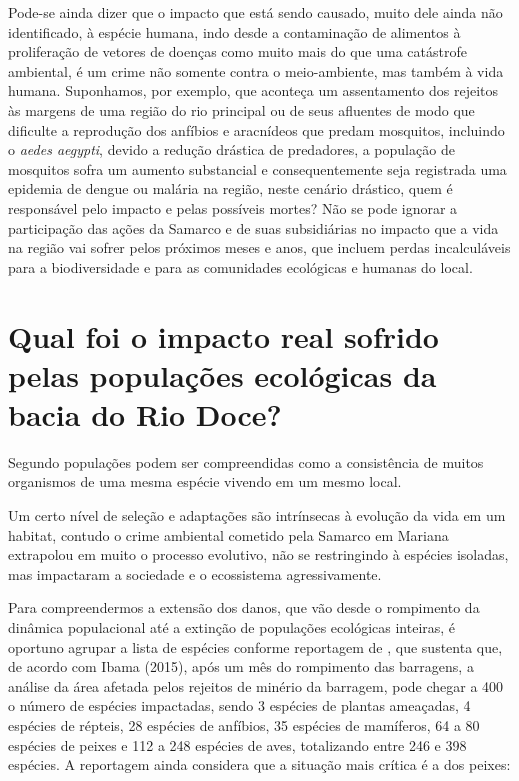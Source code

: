 \documentclass[
article,			%
11pt,				%
oneside,			%
a4paper,			%
english,			%
brazil,				%
sumario=tradicional
]{abntex2}
\begin{document}
	Pode-se ainda dizer que o impacto que está sendo causado, muito dele ainda não identificado, à espécie humana, indo desde a contaminação de alimentos à proliferação de vetores de doenças como muito mais do que uma catástrofe ambiental, é um crime não somente contra o meio-ambiente, mas também à vida humana. Suponhamos, por exemplo, que aconteça um assentamento dos rejeitos às margens de uma região do rio principal ou de seus afluentes de modo que dificulte a reprodução dos anfíbios e aracnídeos que predam mosquitos, incluindo o \textit{aedes aegypti}, devido a redução drástica de predadores, a população de mosquitos sofra um aumento substancial e consequentemente seja registrada uma epidemia de dengue ou malária na região, neste cenário drástico, quem é responsável pelo impacto e pelas possíveis mortes? Não se pode ignorar a participação das ações da Samarco e de suas subsidiárias no impacto que a vida na região vai sofrer pelos próximos meses e anos, que incluem perdas incalculáveis para a biodiversidade e para as comunidades ecológicas e humanas do local.
	
	\section{Qual foi o impacto real sofrido pelas populações ecológicas da bacia do Rio Doce?}
	
	Segundo  populações podem ser compreendidas como a consistência de muitos organismos de uma mesma espécie vivendo em um mesmo local.
	
	Um certo nível de seleção e adaptações são intrínsecas à evolução da vida em um habitat, contudo o crime ambiental cometido pela Samarco em Mariana extrapolou em muito o processo evolutivo, não se restringindo à espécies isoladas, mas impactaram a sociedade e o ecossistema agressivamente.
	
	Para compreendermos a extensão dos danos, que vão desde o rompimento da dinâmica populacional até a extinção de populações ecológicas inteiras, é oportuno agrupar a lista de espécies conforme reportagem de , que sustenta que, de acordo com Ibama (2015), após um mês do rompimento das barragens, a análise da área afetada pelos rejeitos de minério da barragem, pode chegar a 400 o número de espécies impactadas, sendo 3 espécies de plantas ameaçadas, 4 espécies de répteis, 28 espécies de anfíbios, 35 espécies de mamíferos,  64 a 80 espécies de peixes e 112 a 248 espécies de aves, totalizando entre 246 e 398 espécies. A reportagem ainda considera que a situação mais crítica é a dos peixes:
	
\end{document}
